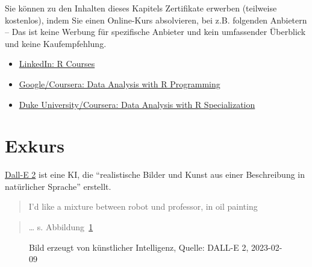 \documentclass[
  a4paper,
]{scrbook}
\providecommand{\tightlist}{%
  \setlength{\itemsep}{0pt}\setlength{\parskip}{0pt}}\usepackage{longtable,booktabs,array}
\theoremstyle{definition}
\theoremstyle{definition}
\theoremstyle{definition}
\theoremstyle{remark}
\begin{document}
Sie können zu den Inhalten dieses Kapitels Zertifikate erwerben
(teilweise kostenlos), indem Sie einen Online-Kurs absolvieren, bei z.B.
folgenden Anbietern -- Das ist keine Werbung für spezifische Anbieter
und kein umfassender Überblick und keine Kaufempfehlung.

\begin{itemize}
\tightlist
\item
  \href{https://www.linkedin.com/learning/search?keywords=R}{LinkedIn: R
  Courses}
\item
  \href{https://www.coursera.org/learn/data-analysis-r\#modules}{Google/Coursera:
  Data Analysis with R Programming}
\item
  \href{https://www.coursera.org/specializations/statistics}{Duke
  University/Coursera: Data Analysis with R Specialization}
\end{itemize}

\section{Exkurs}\label{exkurs}

\href{https://openai.com/dall-e-2/}{Dall-E 2} ist eine KI, die
``realistische Bilder und Kunst aus einer Beschreibung in natürlicher
Sprache'' erstellt.

\begin{quote}
{} I'd like a mixture between robot und professor, in oil
painting
\end{quote}

\begin{quote}
{} \ldots{} s. Abbildung~\ref{fig-mix-rob-prof}
\end{quote}

\begin{figure}


\caption{\label{fig-mix-rob-prof}Bild erzeugt von künstlicher
Intelligenz, Quelle: DALL-E 2, 2023-02-09}

\end{figure}%
\end{document}
